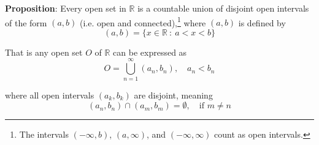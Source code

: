 \documentclass[12pt]{article}
\newcommand{\R}{\mathbb R}
\begin{document}
{\bf Proposition}: Every open set in $\R$ is a countable union of disjoint open intervals of the form $(a, b)$ (i.e. open and connected),\footnote{The intervals $(-\infty, b)$, $(a,\infty)$, and $(-\infty,\infty)$ count as open intervals.} where $(a, b)$ is defined by
\begin{equation*}
	(a, b) = \{x \in \R ~:~ a < x < b\}
\end{equation*}

That is any open set $O$ of $\R$ can be expressed as
\begin{equation*}
	O = \bigcup^\infty_{n = 1} (a_n, b_n), \quad a_n < b_n
\end{equation*}

where all open intervals $(a_k, b_k)$ are disjoint, meaning
\begin{equation*}
	(a_n, b_n) \cap (a_m, b_m) = \emptyset, \quad \text{if } m \neq n
\end{equation*}
\end{document}

